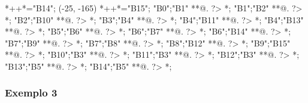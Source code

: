 \begin{scriptsize}
	*++{}*\frm{-,}="B14";
(-25, -165)
	*++{}*\frm{-,}="B15";
"B0";"B1" **@{.} ?> *{\dir{>}};
"B1";"B2" **@{.} ?> *{\dir{>}};
"B2";"B10" **@{.} ?> *{\dir{>}};
"B3";"B4" **@{.} ?> *{\dir{>}};
"B4";"B11" **@{.} ?> *{\dir{>}};
"B4";"B13" **@{.} ?> *{\dir{>}};
"B5";"B6" **@{.} ?> *{\dir{>}};
"B6";"B7" **@{.} ?> *{\dir{>}};
"B6";"B14" **@{.} ?> *{\dir{>}};
"B7";"B9" **@{.} ?> *{\dir{>}};
"B7";"B8" **@{.} ?> *{\dir{>}};
"B8";"B12" **@{.} ?> *{\dir{>}};
"B9";"B15" **@{.} ?> *{\dir{>}};
"B10";"B3" **@{.} ?> *{\dir{>}};
"B11";"B3" **@{.} ?> *{\dir{>}};
"B12";"B3" **@{.} ?> *{\dir{>}};
"B13";"B5" **@{.} ?> *{\dir{>}};
"B14";"B5" **@{.} ?> *{\dir{>}};
\endxy
\end{scriptsize}



\subsubsection{Exemplo 3}

